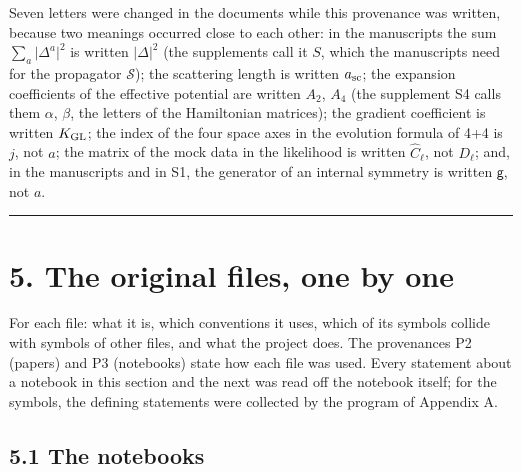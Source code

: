 \documentclass[
  10pt,
]{article}
\begin{document}
Seven letters were changed in the documents while this provenance was
written, because two meanings occurred close to each other: in the
manuscripts the sum \(\sum_a\lvert\Delta^a\rvert^2\) is written
\(\lvert\Delta\rvert^2\) (the supplements call it \(S\), which the
manuscripts need for the propagator \(\mathcal S\)); the scattering
length is written \(a_{\rm sc}\); the expansion coefficients of the
effective potential are written \(A_2\), \(A_4\) (the supplement S4
calls them \(\alpha\), \(\beta\), the letters of the Hamiltonian
matrices); the gradient coefficient is written \(K_{\rm GL}\); the index
of the four space axes in the evolution formula of 4+4 is \(j\), not
\(a\); the matrix of the mock data in the likelihood is written
\(\hat C_\ell\), not \(D_\ell\); and, in the manuscripts and in S1, the
generator of an internal symmetry is written \(\mathsf g\), not \(a\).

\begin{center}\rule{0.5\linewidth}{0.5pt}\end{center}

\hypertarget{the-original-files-one-by-one}{%
\section{5. The original files, one by
one}\label{the-original-files-one-by-one}}

For each file: what it is, which conventions it uses, which of its
symbols collide with symbols of other files, and what the project does.
The provenances P2 (papers) and P3 (notebooks) state how each file was
used. Every statement about a notebook in this section and the next was
read off the notebook itself; for the symbols, the defining statements
were collected by the program of Appendix A.

\hypertarget{the-notebooks}{%
\subsection{5.1 The notebooks}\label{the-notebooks}}
\end{document}
